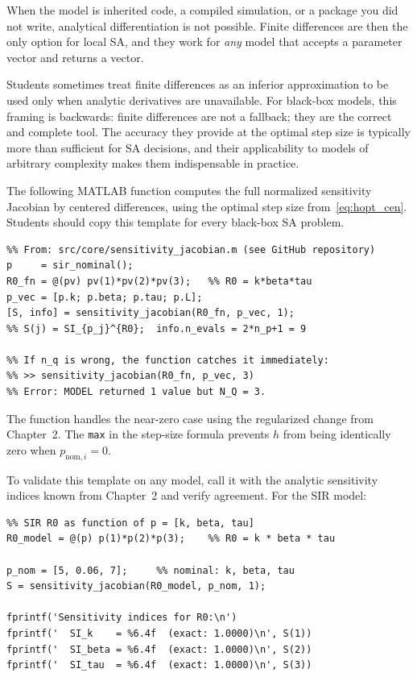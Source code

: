 When the model is inherited code, a compiled simulation,
or a package you did not write, analytical differentiation is
not possible. Finite differences are then the only option for
local SA, and they work for \emph{any} model that accepts a
parameter vector and returns a \QOI vector.

Students sometimes treat finite differences as an inferior
approximation to be used only when analytic derivatives are
unavailable. For black-box models, this framing is backwards:
finite differences are not a fallback; they are the correct and
complete tool. The accuracy they provide at the optimal step size
is typically more than sufficient for SA decisions, and their
applicability to models of arbitrary complexity makes them
indispensable in practice.

The following MATLAB function computes the full normalized
sensitivity Jacobian by centered differences, using the optimal
step size from~\eqref{eq:hopt_cen}.
Students should copy this template for every black-box SA problem.

\begin{small}
\begin{verbatim}
%% From: src/core/sensitivity_jacobian.m (see GitHub repository)
p     = sir_nominal();
R0_fn = @(pv) pv(1)*pv(2)*pv(3);   %% R0 = k*beta*tau
p_vec = [p.k; p.beta; p.tau; p.L];
[S, info] = sensitivity_jacobian(R0_fn, p_vec, 1);
%% S(j) = SI_{p_j}^{R0};  info.n_evals = 2*n_p+1 = 9

%% If n_q is wrong, the function catches it immediately:
%% >> sensitivity_jacobian(R0_fn, p_vec, 3)
%% Error: MODEL returned 1 value but N_Q = 3.
\end{verbatim}
\end{small}

The function handles the near-zero \QOI case using the regularized
change from Chapter~2. The \texttt{max} in the step-size formula
prevents $h$ from being identically zero when $p_{\text{nom},i} = 0$.

To validate this template on any model, call it with the analytic
sensitivity indices known from Chapter~2 and verify agreement.
For the SIR model:

\begin{verbatim}
%% SIR R0 as function of p = [k, beta, tau]
R0_model = @(p) p(1)*p(2)*p(3);    %% R0 = k * beta * tau

p_nom = [5, 0.06, 7];     %% nominal: k, beta, tau
S = sensitivity_jacobian(R0_model, p_nom, 1);

fprintf('Sensitivity indices for R0:\n')
fprintf('  SI_k    = %6.4f  (exact: 1.0000)\n', S(1))
fprintf('  SI_beta = %6.4f  (exact: 1.0000)\n', S(2))
fprintf('  SI_tau  = %6.4f  (exact: 1.0000)\n', S(3))
\end{verbatim}


